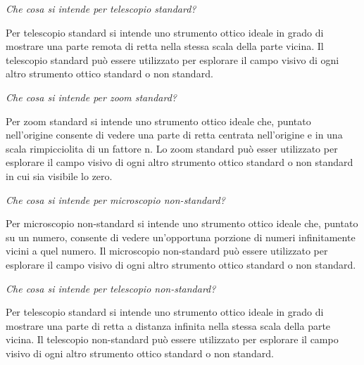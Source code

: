 \begin{esercizio}\label{ese:iper_032} 
\emph{Che cosa si intende per telescopio standard?}

Per telescopio standard si intende uno strumento ottico ideale in grado di 
mostrare una parte remota di retta nella stessa scala della parte vicina. 
Il telescopio standard può essere utilizzato per esplorare il campo visivo 
di ogni altro strumento ottico standard o non standard.
\end{esercizio}

\begin{esercizio}\label{ese:iper_033} 
\emph{Che cosa si intende per zoom standard?}

Per zoom standard si intende uno strumento ottico ideale che, puntato 
nell'origine consente di vedere una parte di retta centrata nell'origine e 
in una scala rimpicciolita di un fattore n. Lo zoom standard può esser 
utilizzato per esplorare il campo visivo di ogni altro strumento ottico 
standard o non standard in cui sia visibile lo zero.
\end{esercizio}

\begin{esercizio}\label{ese:iper_034} 
\emph{Che cosa si intende per microscopio non-standard?}

Per microscopio non-standard si intende uno strumento ottico ideale che, 
puntato su un numero, consente di vedere un'opportuna porzione di numeri 
infinitamente vicini a quel numero. 
Il microscopio non-standard può essere utilizzato per esplorare il campo 
visivo di ogni altro strumento ottico standard o non standard.

\end{esercizio}

\begin{esercizio}\label{ese:iper_035} 
\emph{Che cosa si intende per telescopio non-standard?}

Per telescopio standard si intende uno strumento ottico ideale in grado di 
mostrare una parte di retta a distanza infinita nella stessa scala della 
parte vicina. Il telescopio non-standard può essere utilizzato per esplorare 
il campo visivo di ogni altro strumento ottico standard o non standard.
\end{esercizio}

